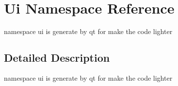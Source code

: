 \hypertarget{namespaceUi}{
\section{Ui Namespace Reference}
\label{namespaceUi}
}


namespace ui is generate by qt for make the code lighter  




\subsection{Detailed Description}
namespace ui is generate by qt for make the code lighter 